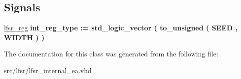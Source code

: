 \subsection*{Signals}
 \begin{DoxyCompactItemize}
\item 
\hypertarget{classlfsr__internal_1_1direct_a3ecfc79e7dbfac52489805f58aabae21}{\hyperlink{classlfsr__internal_1_1direct_a3ecfc79e7dbfac52489805f58aabae21}{lfsr\-\_\-reg} {\bfseries \textcolor{vhdlchar}{int\-\_\-reg\-\_\-type}\textcolor{vhdlchar}{ }\textcolor{vhdlchar}{ }\textcolor{vhdlchar}{\-:}\textcolor{vhdlchar}{=}\textcolor{vhdlchar}{ }\textcolor{comment}{std\-\_\-logic\-\_\-vector}\textcolor{vhdlchar}{ }\textcolor{vhdlchar}{(}\textcolor{vhdlchar}{ }\textcolor{vhdlchar}{ }\textcolor{vhdlchar}{to\-\_\-unsigned}\textcolor{vhdlchar}{ }\textcolor{vhdlchar}{(}\textcolor{vhdlchar}{ }\textcolor{vhdlchar}{ }\textcolor{vhdlchar}{S\-E\-E\-D}\textcolor{vhdlchar}{ }\textcolor{vhdlchar}{,}\textcolor{vhdlchar}{ }\textcolor{vhdlchar}{ }\textcolor{vhdlchar}{W\-I\-D\-T\-H}\textcolor{vhdlchar}{ }\textcolor{vhdlchar}{)}\textcolor{vhdlchar}{ }\textcolor{vhdlchar}{ }\textcolor{vhdlchar}{)}\textcolor{vhdlchar}{ }} }\label{classlfsr__internal_1_1direct_a3ecfc79e7dbfac52489805f58aabae21}

\end{DoxyCompactItemize}


The documentation for this class was generated from the following file\-:\begin{DoxyCompactItemize}
\item 
src/lfsr/lfsr\-\_\-internal\-\_\-ea.\-vhd\end{DoxyCompactItemize}
